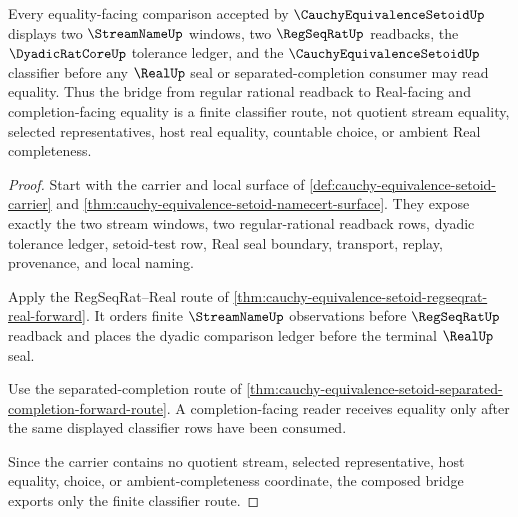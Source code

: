 \begin{theorem}
\label{thm:cauchy-equivalence-setoid-regseqrat-real-classifier-bridge}
Every equality-facing comparison accepted by $\CauchyEquivalenceSetoidUp$ displays two $\StreamNameUp$ windows, two $\RegSeqRatUp$ readbacks, the $\DyadicRatCoreUp$ tolerance ledger, and the $\CauchyEquivalenceSetoidUp$ classifier before any $\RealUp$ seal or separated-completion consumer may read equality. Thus the bridge from regular rational readback to Real-facing and completion-facing equality is a finite classifier route, not quotient stream equality, selected representatives, host real equality, countable choice, or ambient Real completeness.
\end{theorem}
\begin{proof}
Start with the carrier and local surface of \autoref{def:cauchy-equivalence-setoid-carrier} and \autoref{thm:cauchy-equivalence-setoid-namecert-surface}. They expose exactly the two stream windows, two regular-rational readback rows, dyadic tolerance ledger, setoid-test row, Real seal boundary, transport, replay, provenance, and local naming.

Apply the RegSeqRat--Real route of \autoref{thm:cauchy-equivalence-setoid-regseqrat-real-forward}. It orders finite $\StreamNameUp$ observations before $\RegSeqRatUp$ readback and places the dyadic comparison ledger before the terminal $\RealUp$ seal.

Use the separated-completion route of \autoref{thm:cauchy-equivalence-setoid-separated-completion-forward-route}. A completion-facing reader receives equality only after the same displayed classifier rows have been consumed.

Since the carrier contains no quotient stream, selected representative, host equality, choice, or ambient-completeness coordinate, the composed bridge exports only the finite classifier route.
\end{proof}

